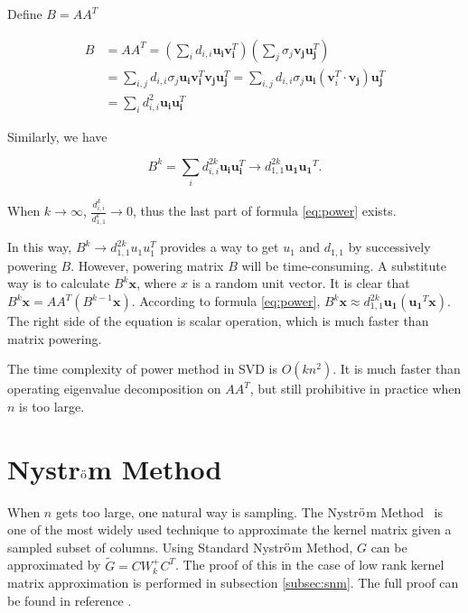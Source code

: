 \documentclass[12pt, a4paper, oneside]{article}
\newcommand{\nysm}{Nystr$\ddot{\rm o}$m Method}
\begin{document}
Define $B = AA^T$

\begin{equation}
	\begin{aligned}
		B &=AA^T=\left(\sum_{i} d_{i,i} \mathbf{u}_{\mathbf{i}} \mathbf{v}_{\mathbf{i}}^{T}\right)\left(\sum_{j} \sigma_{j} \mathbf{v}_{\mathbf{j}} \mathbf{u}_{\mathbf{j}}^{T}\right) \\
		&=\sum_{i, j} d_{i,i} \sigma_{j} \mathbf{u}_{\mathbf{i}} \mathbf{v}_{\mathbf{i}}^{T} \mathbf{v}_{\mathbf{j}} \mathbf{u}_{\mathbf{j}}^{T}=\sum_{i, j}d_{i,i} \sigma_{j} \mathbf{u}_{\mathbf{i}}\left(\mathbf{v}_{i}^{T} \cdot \mathbf{v}_{\mathbf{j}}\right) \mathbf{u}_{\mathbf{j}}^{T} \\
		&=\sum_{i} d_{i,i}^{2} \mathbf{u}_{\mathbf{i}} \mathbf{u}_{\mathbf{i}}^{T}
	\end{aligned}
\end{equation}

Similarly, we have

\begin{equation}
	\label{eq:power}
	B^{k}=\sum_{i} d_{i,i}^{2 k} \mathbf{u}_{\mathbf{i}} \mathbf{u}_{\mathbf{i}}^{T}\to d_{1,1}^{2k}\mathbf{u_1}\mathbf{u_1}^T.
\end{equation}

When $k \to \infty$, $\frac{d_{i,i}^k}{d_{1,1}^k} \to 0$, thus the last part of formula \ref{eq:power} exists.

In this way, $B^k \to d_{1,1}^{2k}u_1u_1^T$ provides a way to get $u_1$ and $d_{1,1}$ by successively powering $B$. However, powering matrix $B$ will be time-consuming. A substitute way is to calculate $B^k \mathbf{x}$, where $x$ is a random unit vector. It is clear that $B^{k} \mathbf{x}=A A^{T}\left(B^{k-1} \mathbf{x}\right)$. According to formula \ref{eq:power}, $B^{k} \mathbf{x} \approx d_{1,1}^{2k}\mathbf{u_1}(\mathbf{u_1}^T \mathbf{x})$. The right side of the equation is scalar operation, which is much faster than matrix powering.

The time complexity of power method in SVD is $O(kn^2)$. It is much faster than operating eigenvalue decomposition on $AA^T$, but still prohibitive in practice when $n$ is too large.

\section{\nysm} %
\label{sec:nm}

When $n$ gets too large, one natural way is sampling. The \nysm\ \cite{nm} is one of the most widely used technique to approximate the kernel matrix given a sampled subset of columns. Using Standard \nysm, $G$ can be approximated by $\tilde{G} = C W_k^+ C^T$. The proof of this in the case of low rank kernel matrix approximation is performed in subsection \ref{subsec:snm}. The full proof can be found in reference \cite{nm}.
\end{document}
